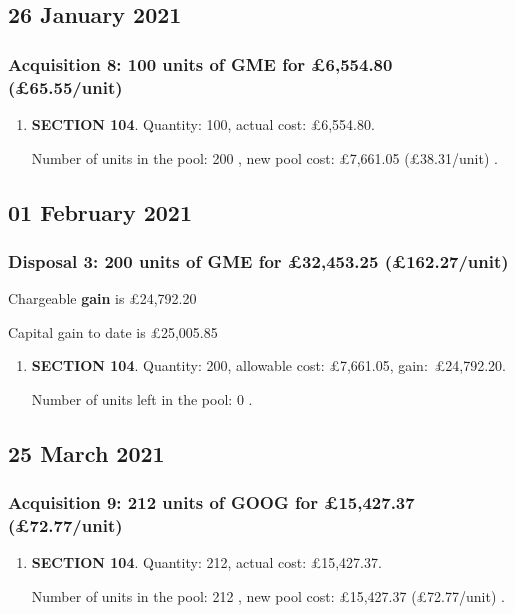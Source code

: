 \documentclass{article}
\begin{document}
\subsection*{26 January 2021}
\subsubsection*{
    Acquisition 8: 100 units of GME for £6,554.80
    (£65.55/unit)%
}

\begin{enumerate}
\item \textbf{SECTION 104}. Quantity: 100,
    actual cost: £6,554.80.

    Number of units in the pool:
    200%
,
    new pool cost: £7,661.05
    (£38.31/unit)%
.

\end{enumerate}



\subsection*{01 February 2021}
\subsubsection*{
    Disposal 3: 200 units of GME
for £32,453.25
    (£162.27/unit)%
}
Chargeable \textbf{gain} is £24,792.20

Capital gain to date is £25,005.85

\begin{enumerate}
\item \textbf{SECTION 104}. Quantity: 200,
    allowable
    cost:
    £7,661.05,
    \mbox{gain: £24,792.20.}

    Number of units left in the pool:
    0%
.

\end{enumerate}



\subsection*{25 March 2021}
\subsubsection*{
    Acquisition 9: 212 units of GOOG for £15,427.37
    (£72.77/unit)%
}

\begin{enumerate}
\item \textbf{SECTION 104}. Quantity: 212,
    actual cost: £15,427.37.

    Number of units in the pool:
    212%
,
    new pool cost: £15,427.37
    (£72.77/unit)%
.

\end{enumerate}
\end{document}
